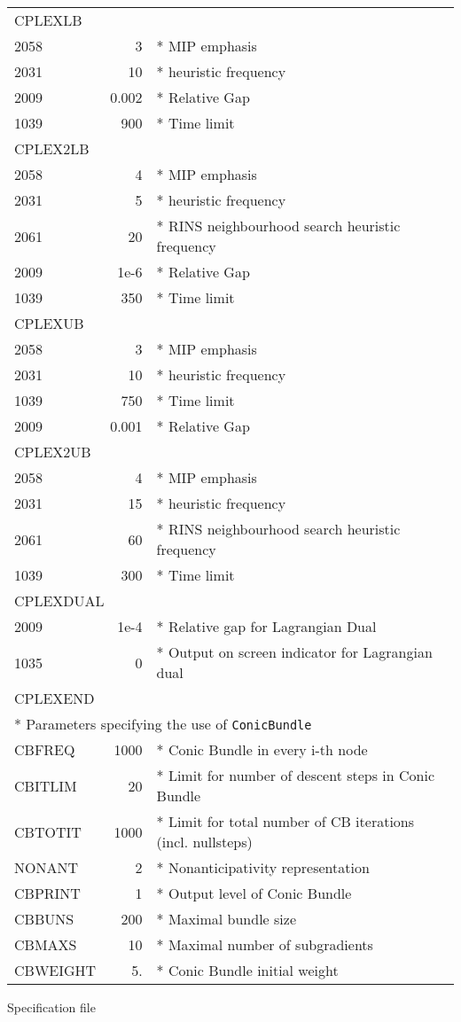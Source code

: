 \documentclass[11pt,draft]{article}
\newcommand{\+}{{\ti{+}}}
\newcommand{\1}{{\ti{1}}}
\begin{document}
\begin{appendix}
\begin{center}
{\begin{tabular}{lrl}
\multicolumn{3}{l}{CPLEXLB}\\
2058 &    3&* MIP emphasis\\
2031 &   10&* heuristic frequency\\
2009 &0.002&* Relative Gap\\
1039 &  900&* Time limit\\
\multicolumn{3}{l}{CPLEX2LB}\\
2058 &    4&* MIP emphasis\\
2031 &    5&* heuristic frequency\\
2061 &   20&* RINS neighbourhood search heuristic frequency\\
2009 & 1e-6&* Relative Gap\\
1039 &  350&* Time limit\\
\multicolumn{3}{l}{CPLEXUB}\\
2058 &    3&* MIP emphasis\\
2031 &   10&* heuristic frequency\\
1039 &  750&* Time limit\\
2009 &0.001&* Relative Gap\\
\multicolumn{3}{l}{CPLEX2UB}\\
2058 &    4&* MIP emphasis\\
2031 &   15&* heuristic frequency\\
2061 &   60&* RINS neighbourhood search heuristic frequency\\
1039 &  300&* Time limit\\
\multicolumn{3}{l}{CPLEXDUAL}\\
2009       &      1e-4 & * Relative gap for Lagrangian Dual\\
1035       &        0 & * Output on screen indicator for Lagrangian dual\\
\multicolumn{3}{l}{CPLEXEND}\medskip\\
\multicolumn{3}{l}{*  Parameters specifying the use of \texttt{ConicBundle}}\medskip\\
CBFREQ &           1000 &* Conic Bundle in every i-th node\\
CBITLIM&             20 &* Limit for number of descent steps in Conic Bundle\\
CBTOTIT&           1000 &* Limit for total number of CB iterations (incl. nullsteps)\\
NONANT       &        2 &* Nonanticipativity representation\\
CBPRINT&              1 &* Output level of Conic Bundle\\
CBBUNS&              200&* Maximal bundle size\\
CBMAXS&               10&* Maximal number of subgradients\\
CBWEIGHT&             5.&* Conic Bundle initial weight\\
\end{tabular}}
\vspace{2ex}

Specification file
\end{center} 
\end{appendix}
\end{document}
